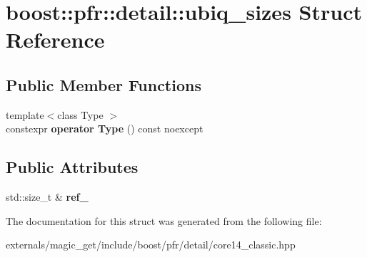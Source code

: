 \hypertarget{structboost_1_1pfr_1_1detail_1_1ubiq__sizes}{}\section{boost\+:\+:pfr\+:\+:detail\+:\+:ubiq\+\_\+sizes Struct Reference}
\label{structboost_1_1pfr_1_1detail_1_1ubiq__sizes}
\subsection*{Public Member Functions}
\begin{DoxyCompactItemize}
\item 
\mbox{\label{structboost_1_1pfr_1_1detail_1_1ubiq__sizes_a2486a9ee063628bbc47a4613065b9717}} 
{\footnotesize template$<$class Type $>$ }\\constexpr {\bfseries operator Type} () const noexcept
\end{DoxyCompactItemize}
\subsection*{Public Attributes}
\begin{DoxyCompactItemize}
\item 
\mbox{\label{structboost_1_1pfr_1_1detail_1_1ubiq__sizes_af2797195059cb1136cbef5eee940a135}} 
std\+::size\+\_\+t \& {\bfseries ref\+\_\+}
\end{DoxyCompactItemize}


The documentation for this struct was generated from the following file\+:\begin{DoxyCompactItemize}
\item 
externals/magic\+\_\+get/include/boost/pfr/detail/core14\+\_\+classic.\+hpp\end{DoxyCompactItemize}
